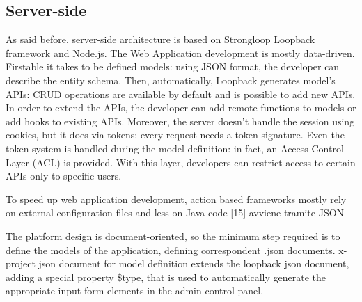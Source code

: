 \documentclass{sig-alternate}
\begin{document}


  


 















\subsection{Server-side}
As said before, server-side architecture is based on Strongloop Loopback framework and Node.js. The Web Application development is mostly data-driven. Firstable it takes to be defined models: using JSON format, the developer can describe the entity schema.
Then, automatically, Loopback generates model’s APIs: CRUD operations are available by default and is possible to add new APIs. In order to extend the APIs, the developer can add remote functions to models or add hooks to existing APIs.
Moreover, the server doesn’t handle the session using cookies, but it does via tokens: every request needs a token signature.
Even the token system is handled during the model definition: in fact, an Access Control Layer (ACL) is provided. With this layer, developers can restrict access to certain APIs only to specific users.




To speed up web application development, action based frameworks mostly rely on external configuration files and less on Java code [15]
avviene tramite JSON




The platform design is document-oriented, so the minimum step required is to define the models of the application, defining correspondent .json documents.
x-project json document for model definition extends the loopback json document, adding a special property \$type, that is used to automatically generate the appropriate input form elements in the admin control panel. 
\end{document}
